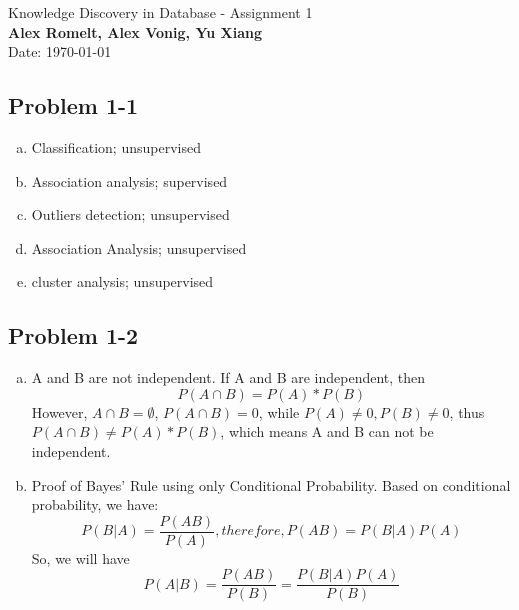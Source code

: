 \documentclass[]{book}
\theoremstyle{definition}
\begin{document}
\begin{center}
{\Large Knowledge Discovery in Database  - Assignment 1 \hspace{0.5cm}}\\
\textbf{Alex Romelt, Alex Vonig, Yu Xiang}\\ %
Date: \today %
\end{center}

\vspace{0.2 cm}


\subsection*{Problem 1-1}
\begin{enumerate}[(a)] %
	\item Classification; unsupervised
	\item Association analysis; supervised
	\item Outliers detection; unsupervised
	\item Association Analysis; unsupervised
	\item cluster analysis; unsupervised
\end{enumerate}



\subsection*{Problem 1-2}
\begin{enumerate}[(a)] %
	\item A and B are not independent. \newline
	If A and B are independent, then $$P(A\cap B) = P(A) * P(B) $$
	However, $A\cap B = \emptyset$, $P(A\cap B) = 0$, while $P(A)\neq 0, P(B)\neq 0 $, thus $P(A\cap B) \neq P(A) * P(B)$, which means A and B can not be independent.
	
	\item Proof of Bayes' Rule using only Conditional Probability. \newline
	Based on conditional probability, we have:
	$$P(B|A) =\frac{P(AB)}{P(A)}, therefore, P(AB) = P(B|A)P(A)$$ 
	So, we will have
	$$P(A|B) =\frac{P(AB)}{P(B)} = \frac{P(B|A)P(A)}{P(B)}$$	
\end{enumerate}
\end{document}
